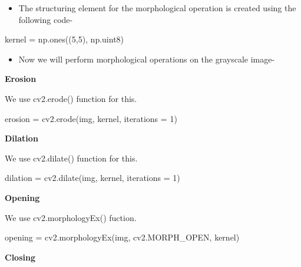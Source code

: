 \documentclass[]{article}
\newenvironment{Shaded}{}{}
\newcommand{\DecValTok}[1]{\textcolor[rgb]{0.25,0.63,0.44}{{#1}}}
\newcommand{\OperatorTok}[1]{\textcolor[rgb]{0.40,0.40,0.40}{{#1}}}
\newcommand{\NormalTok}[1]{{#1}}
\providecommand{\tightlist}{%
  \setlength{\itemsep}{0pt}\setlength{\parskip}{0pt}}
\begin{document}
\begin{itemize}
\tightlist
\item
  The structuring element for the morphological operation is created
  using the following code-
\end{itemize}

\begin{Shaded}
\begin{Highlighting}[]
    \NormalTok{kernel }\OperatorTok{=} \NormalTok{np.ones((}\DecValTok{5}\NormalTok{,}\DecValTok{5}\NormalTok{), np.uint8)}
\end{Highlighting}
\end{Shaded}

\begin{itemize}
\tightlist
\item
  Now we will perform morphological operations on the grayscale image-
\end{itemize}

\textbf{Erosion}

We use cv2.erode() function for this.

\begin{Shaded}
\begin{Highlighting}[]
    \NormalTok{erosion }\OperatorTok{=} \NormalTok{cv2.erode(img, kernel, iterations }\OperatorTok{=} \DecValTok{1}\NormalTok{)}
\end{Highlighting}
\end{Shaded}

\textbf{Dilation}

We use cv2.dilate() function for this.

\begin{Shaded}
\begin{Highlighting}[]
    \NormalTok{dilation }\OperatorTok{=} \NormalTok{cv2.dilate(img, kernel, iterations }\OperatorTok{=} \DecValTok{1}\NormalTok{)}
\end{Highlighting}
\end{Shaded}

\textbf{Opening}

We use cv2.morphologyEx() fuction.

\begin{Shaded}
\begin{Highlighting}[]
    \NormalTok{opening }\OperatorTok{=} \NormalTok{cv2.morphologyEx(img, cv2.MORPH_OPEN, kernel)}
\end{Highlighting}
\end{Shaded}

\textbf{Closing}
\end{document}
